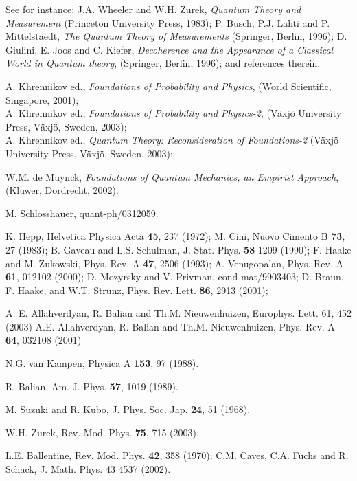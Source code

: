 \documentclass[12pt, onecolumn, aps,prb,floatfix]{revtex4-2}
\begin{document}
\begin{thebibliography}{99}

 See for instance:
J.A. Wheeler and W.H. Zurek, {\it Quantum Theory and Measurement} 
(Princeton University Press, 1983);
P. Busch, P.J. Lahti and P. Mittelstaedt, 
{\it The Quantum Theory of Measurements} (Springer, Berlin, 1996);
D. Giulini, E. Joos and C. Kiefer,
{\it Decoherence and the Appearance of a Classical World in Quantum theory}, 
(Springer, Berlin, 1996);
and references therein.

A. Khrennikov ed., {\it Foundations of Probability and Physics},
(World Scientific, Singapore, 2001); \\
A. Khrennikov ed., {\it Foundations of Probability and Physics-2},
(V\"axj\"o University Press, V\"axj\"o, Sweden, 2003); \\
A. Khrennikov ed., {\it Quantum Theory: Reconsideration of Foundations-2}
(V\"axj\"o University Press, V\"axj\"o, Sweden, 2003);

W.M. de Muynck, {\it Foundations of Quantum Mechanics, an Empirist Approach}, 
(Kluwer, Dordrecht, 2002).

 M. Schlosshauer, quant-ph/0312059.


 K. Hepp, Helvetica Physica Acta {\bf 45}, 237 (1972);
M. Cini, Nuovo Cimento B {\bf 73}, 27 (1983);
B. Gaveau and L.S. Schulman, J. Stat. Phys. {\bf 58} 1209 (1990); 
F. Haake and M. Zukowski, Phys. Rev. A {\bf 47}, 2506 (1993);
A. Venugopalan, Phys. Rev. A {\bf 61}, 012102 (2000);
D. Mozyrsky and V. Privman, cond-mat/9903403;
D. Braun, F. Haake, and W.T. Strunz, Phys. Rev. Lett. {\bf 86}, 2913 (2001);

  A. E. Allahverdyan, R. Balian and 
Th.M.  Nieuwenhuizen,  Europhys. Lett. 61, 452 (2003) 
 A.E. Allahverdyan, R. Balian and Th.M. Nieuwenhuizen, 
Phys. Rev. A {\bf 64}, 032108 (2001)


 N.G. van Kampen, Physica A {\bf 153}, 97 (1988).

 R. Balian, Am. J. Phys. {\bf 57}, 1019 (1989).

M. Suzuki and R. Kubo, J. Phys. Soc. Jap. {\bf 24}, 51 (1968).

 W.H. Zurek, Rev. Mod. Phys. {\bf 75}, 715 (2003).


L.E. Ballentine, Rev. Mod. Phys. {\bf 42}, 358 (1970);
C.M. Caves, C.A. Fuchs and R. Schack, J. Math. Phys. 43  4537 (2002).


\end{thebibliography}
\end{document}
